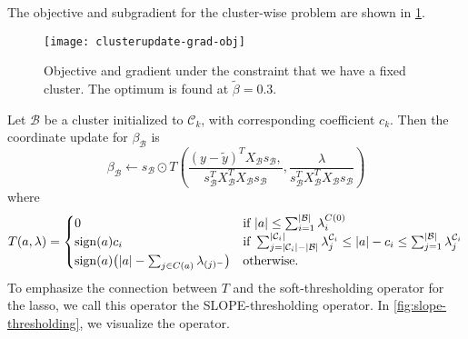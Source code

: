 The objective and subgradient for the cluster-wise problem are shown in
\cref{fig:cluster-grad-obj}.

\begin{figure}[htbp]
  \centering
  \texttt{[image: clusterupdate-grad-obj]}
  \caption{%
    Objective and gradient under the constraint that we have a fixed
    cluster.
    The optimum is found at \(\tilde\beta = 0.3\).
  }%
  \label{fig:cluster-grad-obj}
\end{figure}

Let \(\mathcal{B}\) be a cluster initialized to \(\mathcal{C}_k\), with
corresponding coefficient \(c_k\).
Then the coordinate update for \(\beta_\mathcal{B}\) is
\[
  \beta_\mathcal{B} \gets
  s_\mathcal{B} \odot
    T \left(
      \frac{
        (y - \tilde y)^T X_{\mathcal{B}} s_{\mathcal{B}},
      }{
        s_{\mathcal{B}}^T X_{\mathcal{B}}^T X_{\mathcal{B}} s_{\mathcal{B}}
      } , 
      \frac{
        \lambda 
      }{
        s_{\mathcal{B}}^T X_{\mathcal{B}}^T X_{\mathcal{B}} s_{\mathcal{B}}
      } 
    \right)
\]
where
\begin{equation}
  \label{eq:slope-thresholding}
  T(a, \lambda) =
  \begin{cases}
    0                                                        & \text{if } |a| \leq \sum_{i=1}^{|\mathcal{B}|}\lambda^{C(0)}_i                                                                                                                      \\
    \operatorname{sign}(a)c_i                                              & \text{if } \sum_{j= |\mathcal{C}_i| - |\mathcal{B}|}^{|\mathcal{C}_i|} \lambda^{\mathcal{C}_i}_j \leq |a| - c_i \leq \sum_{j=1}^{|\mathcal{B}|}\lambda^{\mathcal{C}_i}_j \\
    \operatorname{sign}(a)\big(|a| - \sum_{j \in C(a)}\lambda_{(j)^-}\big) & \text{otherwise.
    }
  \end{cases}
\end{equation}
To emphasize the connection between \(T\) and the soft-thresholding operator
for the lasso, we call this operator the SLOPE-thresholding operator.
In \cref{fig:slope-thresholding}, we visualize the operator.


